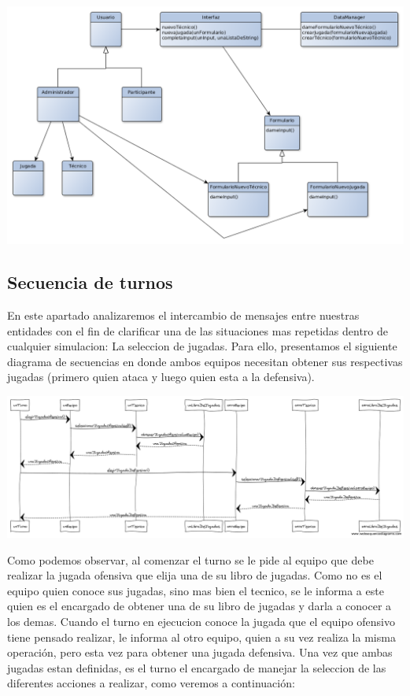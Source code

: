 \begin{center}
\includegraphics[scale=0.4]{diagramas/clases_nuevo_tecnico.png} 
\end{center}

\subsection{Secuencia de turnos}
En este apartado analizaremos el intercambio de mensajes entre nuestras entidades con el fin de clarificar una de las situaciones mas repetidas dentro de cualquier simulacion: La seleccion de jugadas. Para ello, presentamos el siguiente diagrama de secuencias en donde ambos equipos necesitan obtener sus respectivas jugadas (primero quien ataca y luego quien esta a la defensiva).
\begin{center}
\includegraphics[scale=0.4]{diagramas/secuencias-turnos.png}
\end{center}
Como podemos observar, al comenzar el turno se le pide al equipo que debe realizar la jugada ofensiva que elija una de su libro de jugadas. Como no es el equipo quien conoce sus jugadas, sino mas bien el tecnico, se le informa a este quien es el encargado de obtener una de su libro de jugadas y darla a conocer a los demas. Cuando el turno en ejecucion conoce la jugada que el equipo ofensivo tiene pensado realizar, le informa al otro equipo, quien a su vez realiza la misma operación, pero esta vez para obtener una jugada defensiva. Una vez que ambas jugadas estan definidas, es el turno el encargado de manejar la seleccion de las diferentes acciones a realizar, como veremos a continuación:

